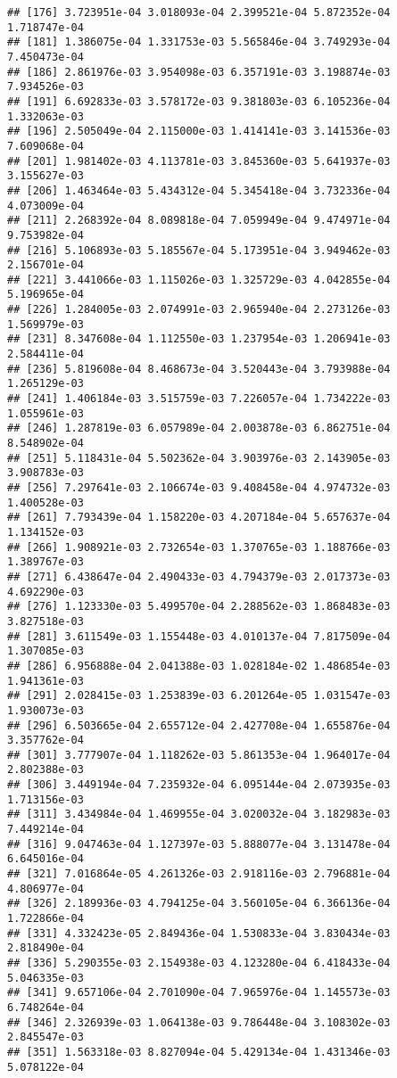 \documentclass[
]{article}
\begin{document}
\begin{verbatim}
## [176] 3.723951e-04 3.018093e-04 2.399521e-04 5.872352e-04 1.718747e-04
## [181] 1.386075e-04 1.331753e-03 5.565846e-04 3.749293e-04 7.450473e-04
## [186] 2.861976e-03 3.954098e-03 6.357191e-03 3.198874e-03 7.934526e-03
## [191] 6.692833e-03 3.578172e-03 9.381803e-03 6.105236e-04 1.332063e-03
## [196] 2.505049e-04 2.115000e-03 1.414141e-03 3.141536e-03 7.609068e-04
## [201] 1.981402e-03 4.113781e-03 3.845360e-03 5.641937e-03 3.155627e-03
## [206] 1.463464e-03 5.434312e-04 5.345418e-04 3.732336e-04 4.073009e-04
## [211] 2.268392e-04 8.089818e-04 7.059949e-04 9.474971e-04 9.753982e-04
## [216] 5.106893e-03 5.185567e-04 5.173951e-04 3.949462e-03 2.156701e-04
## [221] 3.441066e-03 1.115026e-03 1.325729e-03 4.042855e-04 5.196965e-04
## [226] 1.284005e-03 2.074991e-03 2.965940e-04 2.273126e-03 1.569979e-03
## [231] 8.347608e-04 1.112550e-03 1.237954e-03 1.206941e-03 2.584411e-04
## [236] 5.819608e-04 8.468673e-04 3.520443e-04 3.793988e-04 1.265129e-03
## [241] 1.406184e-03 3.515759e-03 7.226057e-04 1.734222e-03 1.055961e-03
## [246] 1.287819e-03 6.057989e-04 2.003878e-03 6.862751e-04 8.548902e-04
## [251] 5.118431e-04 5.502362e-04 3.903976e-03 2.143905e-03 3.908783e-03
## [256] 7.297641e-03 2.106674e-03 9.408458e-04 4.974732e-03 1.400528e-03
## [261] 7.793439e-04 1.158220e-03 4.207184e-04 5.657637e-04 1.134152e-03
## [266] 1.908921e-03 2.732654e-03 1.370765e-03 1.188766e-03 1.389767e-03
## [271] 6.438647e-04 2.490433e-03 4.794379e-03 2.017373e-03 4.692290e-03
## [276] 1.123330e-03 5.499570e-04 2.288562e-03 1.868483e-03 3.827518e-03
## [281] 3.611549e-03 1.155448e-03 4.010137e-04 7.817509e-04 1.307085e-03
## [286] 6.956888e-04 2.041388e-03 1.028184e-02 1.486854e-03 1.941361e-03
## [291] 2.028415e-03 1.253839e-03 6.201264e-05 1.031547e-03 1.930073e-03
## [296] 6.503665e-04 2.655712e-04 2.427708e-04 1.655876e-04 3.357762e-04
## [301] 3.777907e-04 1.118262e-03 5.861353e-04 1.964017e-04 2.802388e-03
## [306] 3.449194e-04 7.235932e-04 6.095144e-04 2.073935e-03 1.713156e-03
## [311] 3.434984e-04 1.469955e-04 3.020032e-04 3.182983e-03 7.449214e-04
## [316] 9.047463e-04 1.127397e-03 5.888077e-04 3.131478e-04 6.645016e-04
## [321] 7.016864e-05 4.261326e-03 2.918116e-03 2.796881e-04 4.806977e-04
## [326] 2.189936e-03 4.794125e-04 3.560105e-04 6.366136e-04 1.722866e-04
## [331] 4.332423e-05 2.849436e-04 1.530833e-04 3.830434e-03 2.818490e-04
## [336] 5.290355e-03 2.154938e-03 4.123280e-04 6.418433e-04 5.046335e-03
## [341] 9.657106e-04 2.701090e-04 7.965976e-04 1.145573e-03 6.748264e-04
## [346] 2.326939e-03 1.064138e-03 9.786448e-04 3.108302e-03 2.845547e-03
## [351] 1.563318e-03 8.827094e-04 5.429134e-04 1.431346e-03 5.078122e-04

\end{verbatim}
\end{document}
